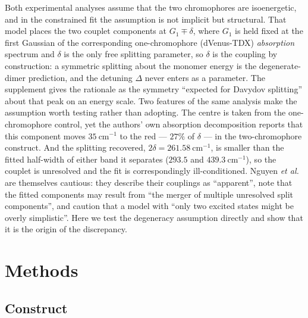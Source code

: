 \documentclass[journal=jpcbfk, manuscript=article, layout=twocolumn, doi=true]{achemso}
\begin{document}
Both experimental analyses assume that the two chromophores are isoenergetic,
and in the constrained fit the assumption is not implicit but structural. That
model places the two couplet components at $G_{1} \mp \delta$, where $G_{1}$ is
held fixed at the first Gaussian of the corresponding one-chromophore
(dVenus-TDX) \emph{absorption} spectrum and $\delta$ is the only free splitting
parameter, so $\delta$ is the coupling by construction: a symmetric splitting
about the monomer energy is the degenerate-dimer prediction, and the detuning
$\Delta$ never enters as a parameter. The supplement gives the rationale as the
symmetry ``expected for Davydov splitting'' about that peak on an energy scale.
Two features of the same analysis make the assumption worth testing rather than
adopting. The centre is taken from the one-chromophore control, yet the
authors' own absorption decomposition reports that this component moves
$35~\mathrm{cm^{-1}}$ to the red --- $27\%$ of $\delta$ --- in the
two-chromophore construct. And the splitting recovered, $2\delta =
261.58~\mathrm{cm^{-1}}$, is smaller than the fitted half-width of either band
it separates ($293.5$ and $439.3~\mathrm{cm^{-1}}$), so the couplet is
unresolved and the fit is correspondingly ill-conditioned. Nguyen \emph{et al.}
are themselves cautious: they describe their couplings as ``apparent'', note
that the fitted components may result from ``the merger of multiple unresolved
split components'', and caution that a model with ``only two excited states
might be overly simplistic''.\cite{nguyen2025anomalous} Here we test the
degeneracy assumption directly and show that it is the origin of the
discrepancy.

\section{Methods}

\subsection{Construct}
\end{document}
